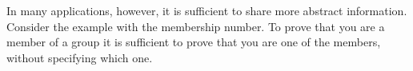 
In many applications, however, it is sufficient to share more abstract information. Consider the example with the membership number. To prove that you are a member of a group it is sufficient to prove that you are one of the members, without specifying which one. %


